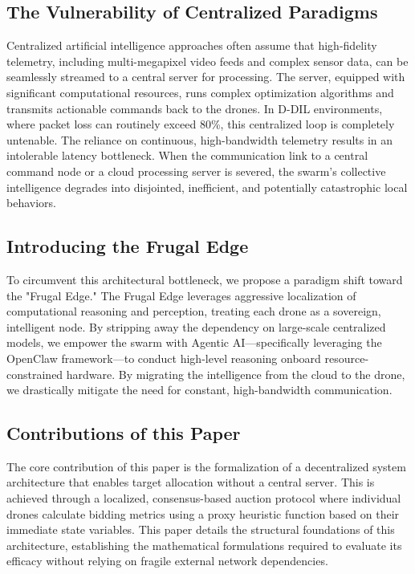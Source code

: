 \documentclass[10pt]{article}
\begin{document}
\subsection{The Vulnerability of Centralized Paradigms}
Centralized artificial intelligence approaches often assume that high-fidelity telemetry, including multi-megapixel video feeds and complex sensor data, can be seamlessly streamed to a central server for processing. The server, equipped with significant computational resources, runs complex optimization algorithms and transmits actionable commands back to the drones. In D-DIL environments, where packet loss can routinely exceed 80\%, this centralized loop is completely untenable. The reliance on continuous, high-bandwidth telemetry results in an intolerable latency bottleneck. When the communication link to a central command node or a cloud processing server is severed, the swarm's collective intelligence degrades into disjointed, inefficient, and potentially catastrophic local behaviors.

\subsection{Introducing the Frugal Edge}
To circumvent this architectural bottleneck, we propose a paradigm shift toward the "Frugal Edge." The Frugal Edge leverages aggressive localization of computational reasoning and perception, treating each drone as a sovereign, intelligent node. By stripping away the dependency on large-scale centralized models, we empower the swarm with Agentic AI—specifically leveraging the OpenClaw framework—to conduct high-level reasoning onboard resource-constrained hardware. By migrating the intelligence from the cloud to the drone, we drastically mitigate the need for constant, high-bandwidth communication. 

\subsection{Contributions of this Paper}
The core contribution of this paper is the formalization of a decentralized system architecture that enables target allocation without a central server. This is achieved through a localized, consensus-based auction protocol where individual drones calculate bidding metrics using a proxy heuristic function based on their immediate state variables. This paper details the structural foundations of this architecture, establishing the mathematical formulations required to evaluate its efficacy without relying on fragile external network dependencies.
\end{document}
